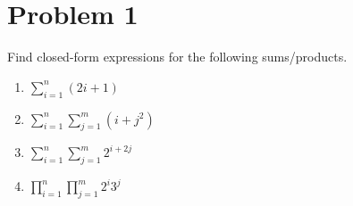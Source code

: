 \usepackage{dashrule}

\newcommand{\hmwkTitle}{Homework 5}
\newcommand{\hmwkDueDate}{Sunday, October 24, 2021}
\newcommand{\hmwkHeaderTitle}{ICCS206 Discrete Mathematic: Homework 5}


\section*{Problem 1}
Find closed-form expressions for the following sums/products.
\begin{enumerate}[label=\arabic*.]
    \item $\displaystyle \sum_{i=1}^n (2i + 1)$
    \item $\displaystyle \sum_{i=1}^n \sum_{j=1}^m (i + j^2)$
    \item $\displaystyle \sum_{i=1}^n \sum_{j=1}^m 2^{i+2j}$
    \item $\displaystyle \prod_{i=1}^n \prod_{j=1}^m 2^i 3^j$
\end{enumerate}
\medskip
\solution

